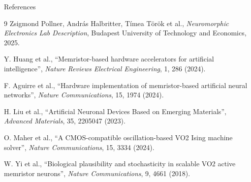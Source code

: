 \documentclass[aspectratio=169]{beamer}
\begin{document}
\begin{frame}{References}
    \footnotesize
    
    \begin{thebibliography}{9}
        Zsigmond Pollner, András Halbritter, Tímea Török et al.,
        \textit{Neuromorphic Electronics Lab Description},
        Budapest University of Technology and Economics, 2025.

        Y. Huang et al.,
        ``Memristor-based hardware accelerators for artificial intelligence'',
        \textit{Nature Reviews Electrical Engineering}, 1, 286 (2024).

        F. Aguirre et al.,
        ``Hardware implementation of memristor-based artificial neural networks'',
        \textit{Nature Communications}, 15, 1974 (2024).

        H. Liu et al.,
        ``Artificial Neuronal Devices Based on Emerging Materials'',
        \textit{Advanced Materials}, 35, 2205047 (2023).

        O. Maher et al.,
        ``A CMOS-compatible oscillation-based VO2 Ising machine solver'',
        \textit{Nature Communications}, 15, 3334 (2024).
        
        W. Yi et al.,
        ``Biological plausibility and stochasticity in scalable VO2 active memristor neurons'',
        \textit{Nature Communications}, 9, 4661 (2018).
    \end{thebibliography}
\end{frame}
\end{document}
